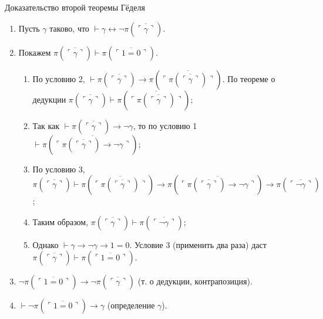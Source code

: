 \documentclass[aspectratio=169]{beamer}
\begin{document}
\begin{frame}{Доказательство второй теоремы Гёделя}
\begin{enumerate}
\item Пусть $\gamma$ таково, что $\vdash \gamma \leftrightarrow \neg\pi(\overline{\ulcorner\gamma\urcorner})$.
\item Покажем $\pi(\overline{\ulcorner\gamma\urcorner})\vdash \pi(\overline{\ulcorner 1=0\urcorner})$. 

\begin{enumerate}
\item По условию 2, $\vdash \pi(\overline{\ulcorner\gamma\urcorner}) \rightarrow \pi(\overline{\ulcorner\pi(\overline{\ulcorner\gamma\urcorner})\urcorner})$.
По теореме о дедукции $\pi(\overline{\ulcorner\gamma\urcorner})\vdash \pi(\overline{\ulcorner\pi(\overline{\ulcorner\gamma\urcorner})\urcorner})$;

\item Так как $\vdash \pi(\overline{\ulcorner\gamma\urcorner})\rightarrow\neg\gamma$, то 
по условию 1 $\vdash \pi(\overline{\ulcorner\pi(\overline{\ulcorner\gamma\urcorner})\rightarrow\neg\gamma\urcorner})$;

\item По условию 3, $\pi(\overline{\ulcorner\gamma\urcorner})\vdash \pi(\overline{\ulcorner\pi(\overline{\ulcorner\gamma\urcorner})\urcorner})
\rightarrow \pi(\overline{\ulcorner\pi(\overline{\ulcorner\gamma\urcorner})\rightarrow\neg\gamma\urcorner})\rightarrow
\pi(\overline{\ulcorner\neg\gamma\urcorner})$;

\item Таким образом, $\pi(\overline{\ulcorner\gamma\urcorner})\vdash\pi(\overline{\ulcorner\neg\gamma\urcorner})$;

\item Однако $\vdash \gamma\rightarrow\neg\gamma\rightarrow 1=0$. Условие 3 (применить два раза) даст $\pi(\overline{\ulcorner\gamma\urcorner})\vdash \pi(\overline{\ulcorner 1=0 \urcorner})$.
\end{enumerate}

\item $\neg\pi(\overline{\ulcorner 1=0 \urcorner})\rightarrow\neg\pi(\overline{\ulcorner\gamma\urcorner})$ (т. о дедукции, контрапозиция).
\item $\vdash \neg\pi(\overline{\ulcorner 1=0 \urcorner})\rightarrow\gamma$ (определение $\gamma$).
\end{enumerate}
\end{frame}
\end{document}
